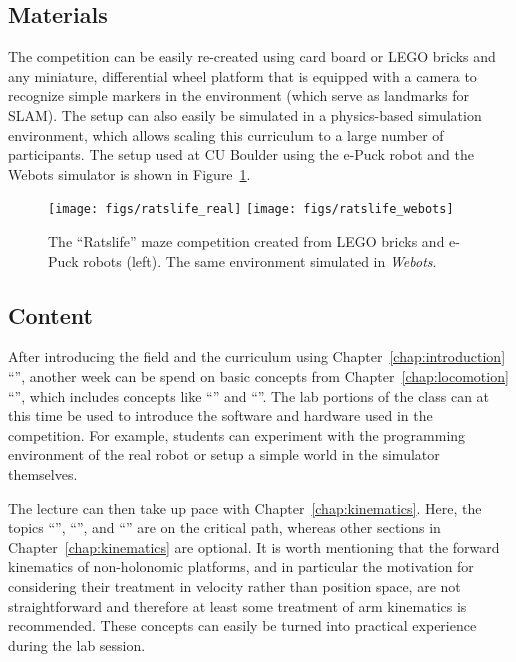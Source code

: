 \documentclass[paper=6.14in:9.21in,pagesize=pdftex,11pt,twoside,openright]{scrbook}
\begin{document}
\subsection{Materials}
The competition can be easily re-created using card board or LEGO bricks and any miniature, differential wheel platform that is equipped with a camera to recognize simple markers in the environment (which serve as landmarks for SLAM). The setup can also easily be simulated in a physics-based simulation environment, which allows scaling this curriculum to a large number of participants. The setup used at CU Boulder using the e-Puck robot and the Webots simulator is shown in Figure~\ref{fig:ratslifereal}.

\begin{figure}[!htb]
\texttt{[image: figs/ratslife\_real]}
\texttt{[image: figs/ratslife\_webots]}
\caption{\label{fig:ratslifereal}The ``Ratslife'' maze competition created from LEGO bricks and e-Puck robots (left). The same environment simulated in \emph{Webots}.}
\end{figure}

\subsection{Content}\label{sec:curr1content}
After introducing the field and the curriculum using Chapter~\ref{chap:introduction} ``'', another week can be spend on basic concepts from Chapter~\ref{chap:locomotion} ``'', which includes concepts like ``'' and ``''. The lab portions of the class can at this time be used to introduce the software and hardware used in the competition. For example, students can experiment with the programming environment of the real robot or setup a simple world in the simulator themselves.

The lecture can then take up pace with Chapter~\ref{chap:kinematics}. Here, the topics ``'', ``'', and ``'' are on the critical path, whereas other sections in Chapter~\ref{chap:kinematics} are optional. It is worth mentioning that the forward kinematics of non-holonomic platforms, and in particular the motivation for considering their treatment in velocity rather than position space, are not straightforward and therefore at least some treatment of arm kinematics is recommended. These concepts can easily be turned into practical experience during the lab session.
\end{document}
